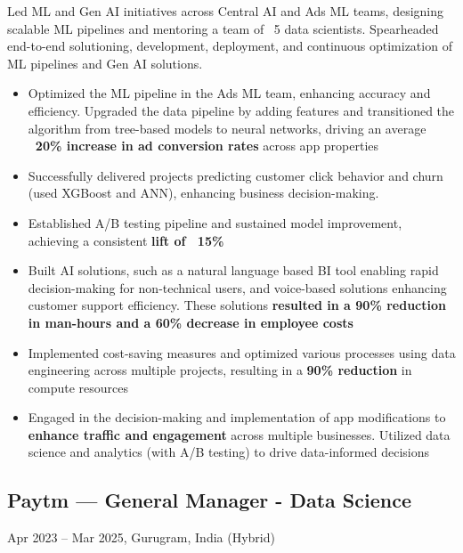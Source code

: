 \documentclass[letterpaper,10pt]{article}
\begin{document}
  Led ML and Gen AI initiatives across Central AI and Ads ML teams, designing scalable ML pipelines and mentoring a team of ~5 data scientists. Spearheaded end-to-end solutioning, development, deployment, and continuous optimization of ML pipelines and Gen AI solutions.
  \begin{itemize}[leftmargin=1em]
      \item Optimized the ML pipeline in the Ads ML team, enhancing accuracy and efficiency. Upgraded the data pipeline by adding features and transitioned the algorithm from tree-based models to neural networks, driving an average \textbf{~20\% increase in ad conversion rates} across app properties
      \item Successfully delivered projects predicting customer click behavior and churn (used XGBoost and ANN), enhancing business decision-making.
      \item Established A/B testing pipeline and sustained model improvement, achieving a consistent \textbf{lift of ~15\%}
      \item Built AI solutions, such as a natural language based BI tool enabling rapid decision-making for non-technical users, and voice-based solutions enhancing customer support efficiency. These solutions \textbf{resulted in a 90\% reduction in man-hours and a 60\% decrease in employee costs}
      \item Implemented cost-saving measures and optimized various processes using data engineering across multiple projects, resulting in a \textbf{90\% reduction} in compute resources
      \item Engaged in the decision-making and implementation of app modifications to \textbf{enhance traffic and engagement} across multiple businesses. Utilized data science and analytics (with A/B testing) to drive data-informed decisions
  \end{itemize}

  \subsection*{Paytm — General Manager - Data Science}
  Apr 2023 – Mar 2025, Gurugram, India (Hybrid)
  \newline {}
  
\end{document}
